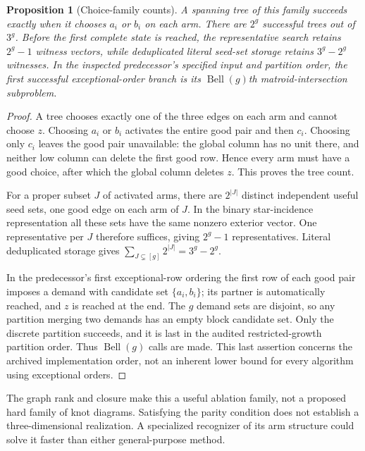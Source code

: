 \documentclass[11pt,letterpaper]{article}
\newtheorem{proposition}[theorem]{Proposition}
\theoremstyle{definition}
\newcommand{\Bell}{\operatorname{Bell}}
\begin{document}
\begin{proposition}[Choice-family counts]\label{prop:family}
A spanning tree of this family succeeds exactly when it chooses $a_i$ or
$b_i$ on each arm. There are $2^g$ successful trees out of $3^g$.
Before the first complete state is reached, the representative search retains
$2^g-1$ witness vectors, while deduplicated literal seed-set storage retains
$3^g-2^g$ witnesses. In the inspected predecessor's specified input and
partition order, the first successful exceptional-order branch is its
$\Bell(g)$th matroid-intersection subproblem.
\end{proposition}
\begin{proof}
A tree chooses exactly one of the three edges on each arm and cannot choose
$z$. Choosing $a_i$ or $b_i$ activates the entire good pair and then $c_i$.
Choosing only $c_i$ leaves the good pair unavailable: the global column has
no unit there, and neither low column can delete the first good row. Hence
every arm must have a good choice, after which the global column deletes $z$.
This proves the tree count.

For a proper subset $J$ of activated arms, there are $2^{|J|}$ distinct
independent useful seed sets, one good edge on each arm of $J$. In the
binary star-incidence representation all these sets have the same nonzero
exterior vector. One representative per $J$ therefore suffices, giving
$2^g-1$ representatives. Literal deduplicated storage gives
$\sum_{J\subsetneq[g]}2^{|J|}=3^g-2^g$.

In the predecessor's first exceptional-row ordering the first row of each
good pair imposes a demand with candidate set $\{a_i,b_i\}$; its partner
is automatically reached, and $z$ is reached at the end. The $g$ demand
sets are disjoint, so any partition merging two demands has an empty block
candidate set. Only the discrete partition succeeds, and it is last in
the audited restricted-growth partition order. Thus $\Bell(g)$ calls are
made. This last assertion concerns the archived implementation order, not
an inherent lower bound for every algorithm using exceptional orders.
\end{proof}

The graph rank and closure make this a useful ablation family, not a proposed
hard family of knot diagrams. Satisfying the parity condition does not
establish a three-dimensional realization. A specialized recognizer of its
arm structure could solve it faster than either general-purpose method.
\end{document}
